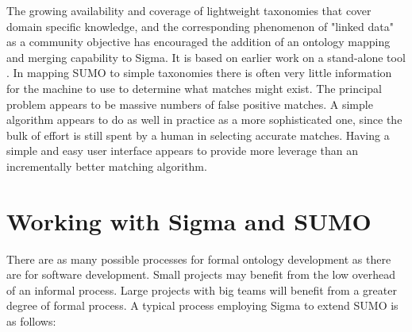 \documentclass{book}
\begin{document}
The growing availability and coverage of lightweight taxonomies that cover
domain specific knowledge, and the corresponding phenomenon of "linked data" as a community objective has encouraged the addition of an
ontology mapping and merging capability to Sigma.  It is based on earlier work
on a stand-alone tool \cite{li2004lom}.  In mapping SUMO to simple taxonomies
there is often very little information for the machine to use to determine what
matches might exist. The principal problem appears to be massive numbers of
false positive matches. A simple algorithm appears to do as well in practice as
a more sophisticated one, since the bulk of effort is still spent by a human in
selecting accurate matches.  Having a simple and easy user interface appears to
provide more leverage than an incrementally better matching algorithm.


\section{Working with Sigma and SUMO}
\label{chap:KnowEngi:sec:Work}

There are as many possible processes for formal ontology development as there
are for software development.  Small projects may benefit from the low overhead
of an informal process.  Large projects with big teams will benefit from a
greater degree of formal process.  A typical process employing Sigma to extend
SUMO is as follows:
\end{document}
